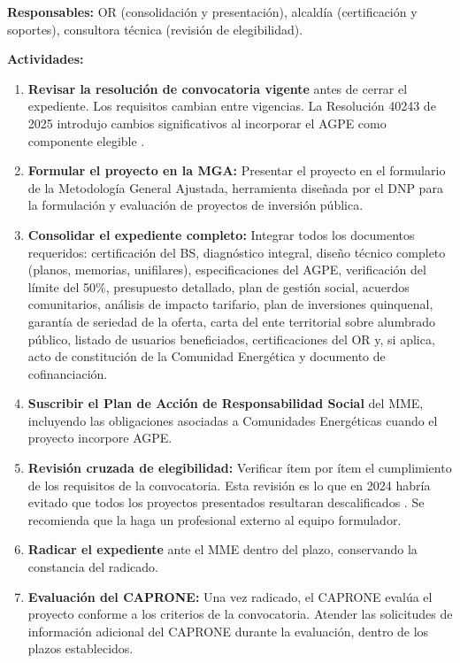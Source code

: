 \textbf{Responsables:} OR (consolidación y presentación), alcaldía
(certificación y soportes), consultora técnica (revisión de elegibilidad).

\textbf{Actividades:}

\begin{enumerate}[label=\textbf{\arabic*.}, leftmargin=1.8cm, itemsep=6pt]

    \item \textbf{Revisar la resolución de convocatoria vigente} antes
    de cerrar el expediente. Los requisitos cambian entre vigencias. La
    Resolución 40243 de 2025 introdujo cambios significativos al
    incorporar el AGPE como componente elegible
    \parencite{ResolucionMME40243_2025}.

    \item \textbf{Formular el proyecto en la MGA:} Presentar el proyecto
    en el formulario de la Metodología General Ajustada, herramienta
    diseñada por el DNP para la formulación y evaluación de proyectos
    de inversión pública.

    \item \textbf{Consolidar el expediente completo:} Integrar todos los
    documentos requeridos: certificación del BS, diagnóstico integral,
    diseño técnico completo (planos, memorias, unifilares),
    especificaciones del AGPE, verificación del límite del 50\%,
    presupuesto detallado, plan de gestión social, acuerdos comunitarios,
    análisis de impacto tarifario, plan de inversiones quinquenal,
    garantía de seriedad de la oferta, carta del ente territorial sobre
    alumbrado público, listado de usuarios beneficiados, certificaciones
    del OR y, si aplica, acto de constitución de la Comunidad Energética
    y documento de cofinanciación.

    \item \textbf{Suscribir el Plan de Acción de Responsabilidad Social}
    del MME, incluyendo las obligaciones asociadas a Comunidades
    Energéticas cuando el proyecto incorpore AGPE.

    \item \textbf{Revisión cruzada de elegibilidad:} Verificar ítem por
    ítem el cumplimiento de los requisitos de la convocatoria. Esta
    revisión es lo que en 2024 habría evitado que todos los proyectos
    presentados resultaran descalificados \parencite{MME2025}. Se
    recomienda que la haga un profesional externo al equipo formulador.

    \item \textbf{Radicar el expediente} ante el MME dentro del plazo,
    conservando la constancia del radicado.

    \item \textbf{Evaluación del CAPRONE:} Una vez radicado, el CAPRONE
    evalúa el proyecto conforme a los criterios de la convocatoria.
    Atender las solicitudes de información adicional del CAPRONE durante
    la evaluación, dentro de los plazos establecidos.
\end{enumerate}

